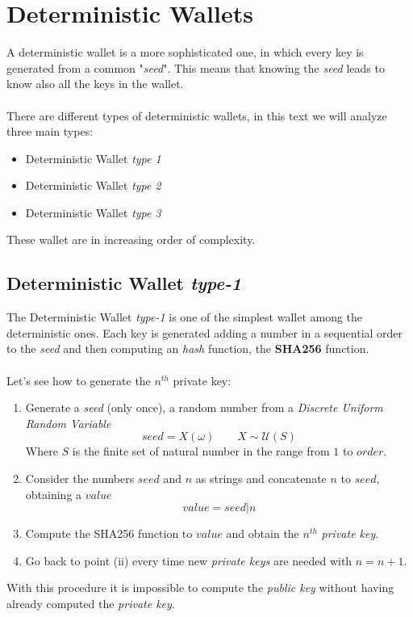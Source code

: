 \section{Deterministic Wallets}
A deterministic wallet is a more sophisticated one, in which every key is generated from a common "\textit{seed}". This means that knowing the \textit{seed} leads to know also all the keys in the wallet.\\ \\
There are different types of deterministic wallets, in this text we will analyze three main types:
\begin{itemize}
	\item Deterministic Wallet \textit{type 1}
	\item Deterministic Wallet \textit{type 2}
	\item Deterministic Wallet \textit{type 3}
\end{itemize}
These wallet are in increasing order of complexity.

\subsection{Deterministic Wallet \textit{type-1}}
The Deterministic Wallet \textit{type-1} is one of the simplest wallet among the deterministic ones. Each key is generated adding a number in a sequential order to the \textit{seed} and then computing an \textit{hash} function, the \textbf{SHA256} function.
\\ \\
Let's see how to generate the $n^{th}$ private key:

\begin{enumerate}[label=(\roman*)]
	\item Generate a \textit{seed} (only once), a random number from a \textit{Discrete Uniform Random Variable}
	\begin{equation*}
	seed=X(\omega) \qquad X\sim \mathcal{U}(S)
	\end{equation*}
	Where $S$ is the finite set of natural number in the range from $1$ to $order$.
	\item Consider the numbers $seed$ and $n$ as strings and concatenate $n$ to $seed$, obtaining a $value$
	\begin{equation*}
	value=seed|n
	\end{equation*}
	\item Compute the SHA256 function to $value$ and obtain the $n^{th}$ \textit{private key}.
	\item Go back to point (ii) every time new \textit{private keys} are needed with $n=n+1$. 
\end{enumerate}
With this procedure it is impossible to compute the \textit{public key} without having already computed the \textit{private key}.

